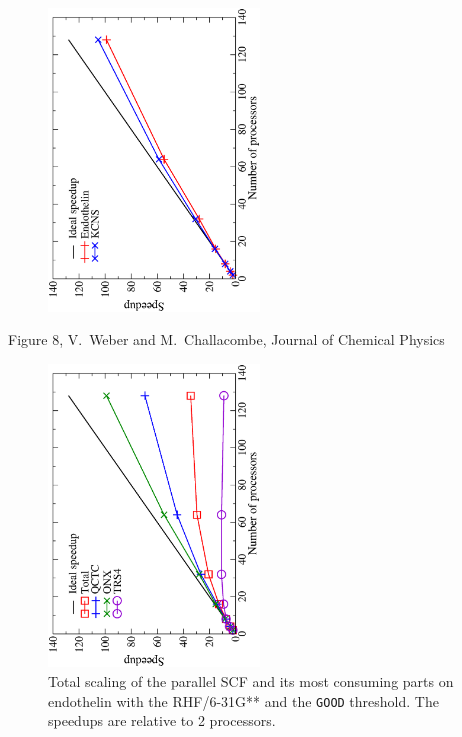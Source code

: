 \documentclass[prl,preprint,doublespace]{revtex4} %
\begin{document}
{\begin{figure}[h]
\begin{center}
\includegraphics[angle=-90,width=0.5\textwidth]{Endothelin_KCNS}
\end{center}

\end{figure}

\clearpage
Figure 8, V.~Weber  and M.~Challacombe, Journal of Chemical Physics \\[1.cm]
\begin{figure}[h]
  \caption{\protect
    Total scaling of the parallel SCF and its most consuming parts
    on endothelin with the RHF/6-31G**
    and the {\tt GOOD} threshold.
    The speedups are relative to 2 processors.
  }\label{fig:EndothelinTotalTiming}

\begin{center}
\includegraphics[angle=-90,width=0.5\textwidth]{EndothelinTotalTiming}
\end{center}

\end{figure}

} %

\end{document}
